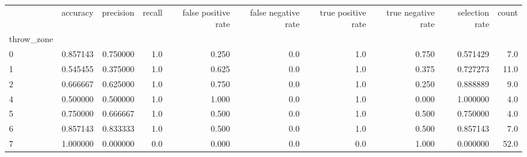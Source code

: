 \begin{tabular}{lrrrrrrrrr}
\toprule
{} &  accuracy &  precision &  recall &  false positive rate &  false negative rate &  true positive rate &  true negative rate &  selection rate &  count \\
throw\_zone &           &            &         &                      &                      &                     &                     &                 &        \\
\midrule
0          &  0.857143 &   0.750000 &     1.0 &                0.250 &                  0.0 &                 1.0 &               0.750 &        0.571429 &    7.0 \\
1          &  0.545455 &   0.375000 &     1.0 &                0.625 &                  0.0 &                 1.0 &               0.375 &        0.727273 &   11.0 \\
2          &  0.666667 &   0.625000 &     1.0 &                0.750 &                  0.0 &                 1.0 &               0.250 &        0.888889 &    9.0 \\
4          &  0.500000 &   0.500000 &     1.0 &                1.000 &                  0.0 &                 1.0 &               0.000 &        1.000000 &    4.0 \\
5          &  0.750000 &   0.666667 &     1.0 &                0.500 &                  0.0 &                 1.0 &               0.500 &        0.750000 &    4.0 \\
6          &  0.857143 &   0.833333 &     1.0 &                0.500 &                  0.0 &                 1.0 &               0.500 &        0.857143 &    7.0 \\
7          &  1.000000 &   0.000000 &     0.0 &                0.000 &                  0.0 &                 0.0 &               1.000 &        0.000000 &   52.0 \\
\bottomrule
\end{tabular}
